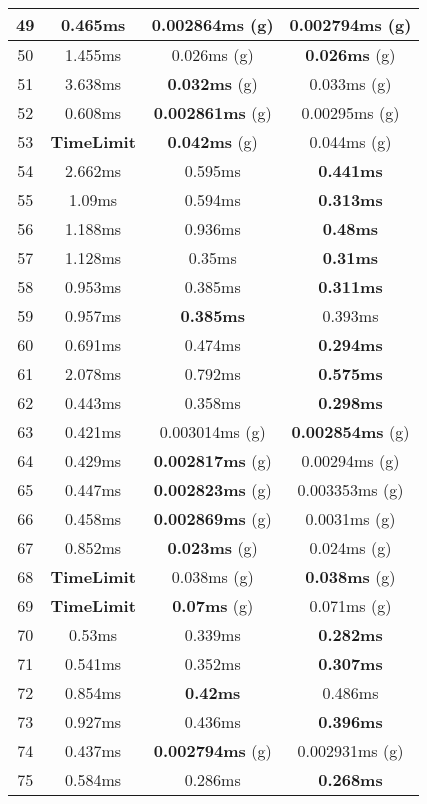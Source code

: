 \begin{table}[H]
\begin{minipage}{5cm}
{\begin{tabular}{|c|c|c|c|}
\hline
49 & 0.465ms & 0.002864ms (g) & \textbf{0.002794ms} (g) \\
\hline
50 & 1.455ms & 0.026ms (g) & \textbf{0.026ms} (g) \\
\hline
51 & 3.638ms & \textbf{0.032ms} (g) & 0.033ms (g) \\
\hline
52 & 0.608ms & \textbf{0.002861ms} (g) & 0.00295ms (g) \\
\hline
53 & \textbf{TimeLimit} & \textbf{0.042ms} (g) & 0.044ms (g) \\
\hline
54 & 2.662ms & 0.595ms & \textbf{0.441ms} \\
\hline
55 & 1.09ms & 0.594ms & \textbf{0.313ms} \\
\hline
56 & 1.188ms & 0.936ms & \textbf{0.48ms} \\
\hline
57 & 1.128ms & 0.35ms & \textbf{0.31ms} \\
\hline
58 & 0.953ms & 0.385ms & \textbf{0.311ms} \\
\hline
59 & 0.957ms & \textbf{0.385ms} & 0.393ms \\
\hline
60 & 0.691ms & 0.474ms & \textbf{0.294ms} \\
\hline
61 & 2.078ms & 0.792ms & \textbf{0.575ms} \\
\hline
62 & 0.443ms & 0.358ms & \textbf{0.298ms} \\
\hline
63 & 0.421ms & 0.003014ms (g) & \textbf{0.002854ms} (g) \\
\hline
64 & 0.429ms & \textbf{0.002817ms} (g) & 0.00294ms (g) \\
\hline
65 & 0.447ms & \textbf{0.002823ms} (g) & 0.003353ms (g) \\
\hline
66 & 0.458ms & \textbf{0.002869ms} (g) & 0.0031ms (g) \\
\hline
67 & 0.852ms & \textbf{0.023ms} (g) & 0.024ms (g) \\
\hline
68 & \textbf{TimeLimit} & 0.038ms (g) & \textbf{0.038ms} (g) \\
\hline
69 & \textbf{TimeLimit} & \textbf{0.07ms} (g) & 0.071ms (g) \\
\hline
70 & 0.53ms & 0.339ms & \textbf{0.282ms} \\
\hline
71 & 0.541ms & 0.352ms & \textbf{0.307ms} \\
\hline
72 & 0.854ms & \textbf{0.42ms} & 0.486ms \\
\hline
73 & 0.927ms & 0.436ms & \textbf{0.396ms} \\
\hline
74 & 0.437ms & \textbf{0.002794ms} (g) & 0.002931ms (g) \\
\hline
75 & 0.584ms & 0.286ms & \textbf{0.268ms} \\

\end{tabular}}
\end{minipage}
\end{table}
